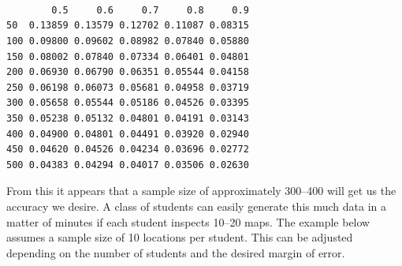 \begin{knitrout}
{\begin{kframe}
\begin{flushleft}
\hlstd{}\hlassignement{\usebox{\hlnormalsizeboxlessthan}-}{\ }\hlkeyword{(}\hlkeyword{,}{\ }\hlkeyword{,}{\ }\hlkeyword{)}\hspace*{\fill}\\
\hlstd{}\hlkeyword{(}\hlkeyword{)}{\ }\hlassignement{\usebox{\hlnormalsizeboxlessthan}-}{\ }\hspace*{\fill}\\
\hlstd{}\hlkeyword{(}\hlkeyword{)}{\ }\hlassignement{\usebox{\hlnormalsizeboxlessthan}-}{\ }\hspace*{\fill}\\
\hlstd{}\mbox{}
\normalfont
\end{flushleft}
\begin{verbatim}
        0.5     0.6     0.7     0.8     0.9
50  0.13859 0.13579 0.12702 0.11087 0.08315
100 0.09800 0.09602 0.08982 0.07840 0.05880
150 0.08002 0.07840 0.07334 0.06401 0.04801
200 0.06930 0.06790 0.06351 0.05544 0.04158
250 0.06198 0.06073 0.05681 0.04958 0.03719
300 0.05658 0.05544 0.05186 0.04526 0.03395
350 0.05238 0.05132 0.04801 0.04191 0.03143
400 0.04900 0.04801 0.04491 0.03920 0.02940
450 0.04620 0.04526 0.04234 0.03696 0.02772
500 0.04383 0.04294 0.04017 0.03506 0.02630
\end{verbatim}
\end{kframe}}
\end{knitrout}

From this it appears that a sample size of approximately 300--400 will get
us the accuracy we desire.  A class of students can easily generate
this much data in a matter of minutes if each student inspects 10--20 maps.
The example below assumes a sample size of 10 locations per student.
This can be adjusted depending on the number of students and the desired
margin of error.

